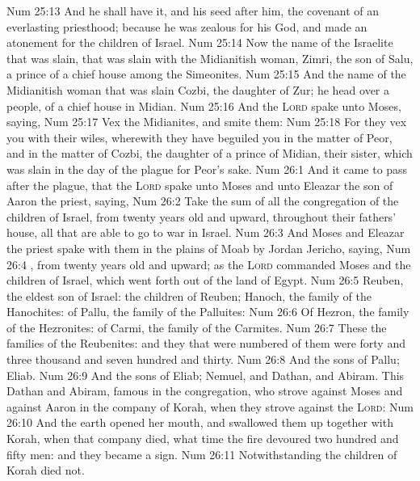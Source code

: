 \vs Num 25:13 And he shall have it, and his seed after him,  the covenant of an everlasting priesthood; because he was zealous for his God, and made an atonement for the children of Israel.
\vs Num 25:14 Now the name of the Israelite that was slain,  that was slain with the Midianitish woman,  Zimri, the son of Salu, a prince of a chief house among the Simeonites.
\vs Num 25:15 And the name of the Midianitish woman that was slain  Cozbi, the daughter of Zur; he  head over a people,  of a chief house in Midian.
\vs Num 25:16 And the \textsc{Lord} spake unto Moses, saying,
\vs Num 25:17 Vex the Midianites, and smite them:
\vs Num 25:18 For they vex you with their wiles, wherewith they have beguiled you in the matter of Peor, and in the matter of Cozbi, the daughter of a prince of Midian, their sister, which was slain in the day of the plague for Peor's sake.
\vs Num 26:1 And it came to pass after the plague, that the \textsc{Lord} spake unto Moses and unto Eleazar the son of Aaron the priest, saying,
\vs Num 26:2 Take the sum of all the congregation of the children of Israel, from twenty years old and upward, throughout their fathers' house, all that are able to go to war in Israel.
\vs Num 26:3 And Moses and Eleazar the priest spake with them in the plains of Moab by Jordan  Jericho, saying,
\vs Num 26:4 , from twenty years old and upward; as the \textsc{Lord} commanded Moses and the children of Israel, which went forth out of the land of Egypt.
\vs Num 26:5 Reuben, the eldest son of Israel: the children of Reuben; Hanoch,  the family of the Hanochites: of Pallu, the family of the Palluites:
\vs Num 26:6 Of Hezron, the family of the Hezronites: of Carmi, the family of the Carmites.
\vs Num 26:7 These  the families of the Reubenites: and they that were numbered of them were forty and three thousand and seven hundred and thirty.
\vs Num 26:8 And the sons of Pallu; Eliab.
\vs Num 26:9 And the sons of Eliab; Nemuel, and Dathan, and Abiram. This  Dathan and Abiram,  famous in the congregation, who strove against Moses and against Aaron in the company of Korah, when they strove against the \textsc{Lord}:
\vs Num 26:10 And the earth opened her mouth, and swallowed them up together with Korah, when that company died, what time the fire devoured two hundred and fifty men: and they became a sign.
\vs Num 26:11 Notwithstanding the children of Korah died not.
